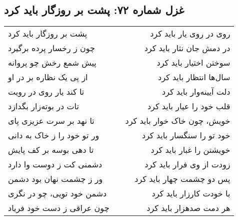 \begin{center}
\section*{غزل شماره ۷۲: پشت بر روزگار باید کرد}
\label{sec:072}
\begin{longtable}{l p{0.5cm} r}
پشت بر روزگار باید کرد
&&
روی در روی یار باید کرد
\\
چون ز رخسار پرده برگیرد
&&
در دمش جان نثار باید کرد
\\
پیش شمع رخش چو پروانه
&&
سوختن اختیار باید کرد
\\
از پی یک نظاره بر در او
&&
سال‌ها انتظار باید کرد
\\
تا کند یار روی در رویت
&&
دلت آیینه‌وار باید کرد
\\
تات در بوته‌زار بگدازد
&&
قلب خود را عیار باید کرد
\\
تا نهد بر سرت عزیزی پای
&&
خویش، چون خاک خوار باید کرد
\\
ور تو خود را ز خاک به دانی
&&
خود تو را سنگسار باید کرد
\\
تا دهی بوسه بر کف پایش
&&
خویشتن را غبار باید کرد
\\
دشمنی کت ز دوست وا دارد
&&
زودت از وی فرار باید کرد
\\
ور ز چشمت نهان بود دشمن
&&
پس دو چشمت چهار باید کرد
\\
دشمن خود تویی، چو در نگری
&&
با خودت کارزار باید کرد
\\
چون عراقی ز دست خود فریاد
&&
هر دمت صدهزار باید کرد
\\
\end{longtable}
\end{center}
